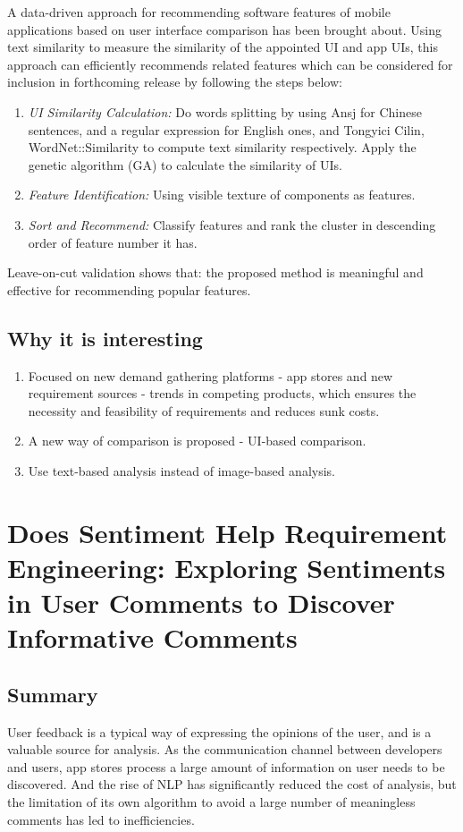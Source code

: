\documentclass[10pt,conference]{IEEEtran}
\begin{document}
A data-driven approach for recommending software features of mobile applications based on user interface comparison has been brought about. Using text similarity to measure the similarity of the appointed UI and app UIs, this approach can efficiently recommends related features which can be considered for inclusion in forthcoming release by following the steps below:

\begin{enumerate}
    \item \emph{UI Similarity Calculation: }  Do words splitting by using Ansj for Chinese sentences, and a regular expression for English ones, and Tongyici Cilin, WordNet::Similarity to compute text similarity respectively. Apply the genetic algorithm (GA) to calculate the similarity of UIs.
    \item \emph{Feature Identification: } Using visible texture of components as features. 
    \item \emph{Sort and Recommend: } Classify features and rank the cluster in descending order of feature number it has.
\end{enumerate}

Leave-on-cut validation shows that: the proposed method is meaningful and effective for recommending popular features.

\subsection{Why it is interesting}
\begin{enumerate}
    \item Focused on new demand gathering platforms - app stores and new requirement sources - trends in competing products, which ensures the necessity and feasibility of requirements and reduces sunk costs.
    \item A new way of comparison is proposed - UI-based comparison.
    \item Use text-based analysis instead of image-based analysis.
\end{enumerate}

\section{Does Sentiment Help Requirement Engineering: Exploring Sentiments in User Comments to Discover Informative Comments\cite{jeong2021does}}

\subsection{Summary}
User feedback is a typical way of expressing the opinions of the user, and is a valuable source for analysis.  As the communication channel between developers and users, app stores process a large amount of information on user needs to be discovered. And the rise of NLP has significantly reduced the cost of analysis, but the limitation of its own algorithm to avoid a large number of meaningless comments has led to inefficiencies. 
\end{document}
